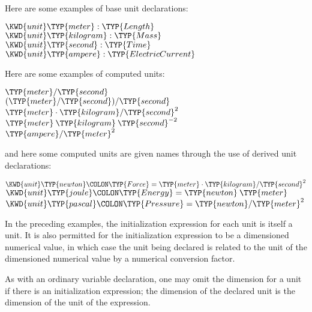 Here are some examples of base unit declarations:
\begin{Fortress}
\(\KWD{unit} \TYP{meter} \mathrel{\mathtt{:}} \TYP{Length}\)\\
\(\KWD{unit} \TYP{kilogram} \mathrel{\mathtt{:}} \TYP{Mass}\)\\
\(\KWD{unit} \TYP{second} \mathrel{\mathtt{:}} \TYP{Time}\)\\
\(\KWD{unit} \TYP{ampere} \mathrel{\mathtt{:}} \TYP{ElectricCurrent}\)
\end{Fortress}
Here are some examples of computed units:
\begin{Fortress}
\(\TYP{meter} / \TYP{second}\)\\
\((\TYP{meter} / \TYP{second}) / \TYP{second}\)\\
\(\TYP{meter} \cdot \TYP{kilogram} / \TYP{second}^{2}\)\\
\(\TYP{meter}\mskip 4mu plus 4mu\TYP{kilogram}\mskip 4mu plus 4mu\TYP{second}^{-2}\)\\
\(\TYP{ampere} / \TYP{meter}^{2}\)
\end{Fortress}
and here some computed units are given names through the use of
derived unit declarations:
\begin{Fortress}
\(\KWD{unit} \TYP{newton}\COLON \TYP{Force} = \TYP{meter} \cdot \TYP{kilogram} / \TYP{second}^{2}\)\\
\(\KWD{unit} \TYP{joule}\COLON \TYP{Energy} = \TYP{newton}\mskip 4mu plus 4mu\TYP{meter}\)\\
\(\KWD{unit} \TYP{pascal}\COLON \TYP{Pressure} = \TYP{newton} / \TYP{meter}^{2}\)
\end{Fortress}
In the preceding examples, the initialization expression for each unit
is itself a unit.  It is also permitted for the initialization
expression to be a dimensioned numerical value, in which case
the unit being declared is related to the unit of the dimensioned
numerical value by a numerical conversion factor.

As with an ordinary variable declaration, one may omit the dimension for a unit
if there is an initialization expression; the dimension of the declared unit is
the dimension of the unit of the expression.

